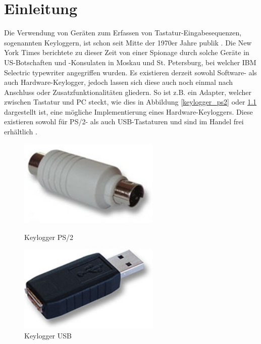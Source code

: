 \chapter{Einleitung}
\label{einleitung}
Die Verwendung von Geräten zum Erfassen von Tastatur-Eingabesequenzen, sogenannten Keyloggern, ist schon seit Mitte der 1970er Jahre publik \cite{engelberg}. Die New York Times berichtete zu dieser Zeit von einer Spionage durch solche Geräte in US-Botschaften und -Konsulaten in Moskau und St. Petersburg, bei welcher IBM Selectric typewriter angegriffen wurden. Es existieren derzeit sowohl Software- als auch Hardware-Keylogger, jedoch lassen sich diese auch noch einmal nach Anschluss oder Zusatzfunktionalitäten gliedern. So ist z.B. ein Adapter, welcher zwischen Tastatur und PC steckt, wie dies in Abbildung \ref{keylogger_ps2} \cite{keylogger_ps2} oder \ref{keylogger_usb} \cite{keylogger_usb} dargestellt ist, eine mögliche Implementierung eines Hardware-Keyloggers. Diese existieren sowohl für PS/2- als auch USB-Tastaturen und sind im Handel frei erhältlich \cite{keelog}.
\begin{figure}
  \centering
  \begin{minipage}{0.45\textwidth}
    \centering
    \includegraphics[width=0.6\textwidth]{images/keylogger_ps2.jpg}
    \caption{Keylogger PS/2}
    \label{keylogger_ps2}
  \end{minipage}
  \begin{minipage}{0.45\textwidth}
    \centering
    \includegraphics[width=0.6\textwidth]{images/keylogger_usb.jpg}
    \caption{Keylogger USB}
    \label{keylogger_usb}
  \end{minipage}
\end{figure}

